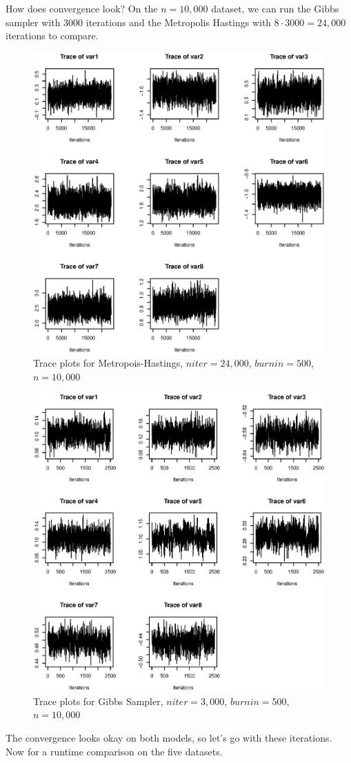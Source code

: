 \documentclass[12pt]{article}
\begin{document}
How does convergence look? On the $n=10,000$ dataset, we can run the Gibbs sampler with 3000 iterations and the Metropolis Hastings with $8 \cdot 3000 = 24,000$ iterations to compare.
\begin{figure}[H] \center
\includegraphics[scale=.45]{MH_Trace}
\caption{Trace plots for Metropois-Hastings, $niter=24,000$, $burnin=500$, $n=10,000$}
\end{figure}
\begin{figure}[H] \center
\includegraphics[scale=.45]{Gibbs_Trace}
\caption{Trace plots for Gibbs Sampler, $niter=3,000$, $burnin=500$, $n=10,000$}
\end{figure}
The convergence looks okay on both models, so let's go with these iterations. Now for a runtime comparison on the five datasets.
\end{document}
